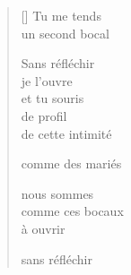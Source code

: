 \documentclass[11pt,a4paper]{article}
\begin{document}
\thispagestyle{empty}


\settowidth{\versewidth}{de cette intimité}

\bigskip

\begin{verse}[\versewidth]
  Tu me tends \\
  un second bocal

  Sans réfléchir \\
  je l'ouvre \\
  et tu souris \\
  de profil \\
  de cette intimité

  comme des mariés

  nous sommes \\
  comme ces bocaux \\
  à ouvrir

  sans réfléchir
\end{verse}
\end{document}
